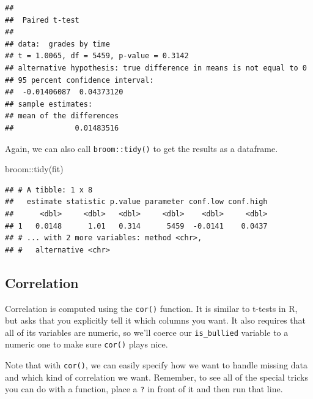 \documentclass[
]{book}
\newenvironment{Shaded}{\begin{snugshade}}{\end{snugshade}}
\newcommand{\AttributeTok}[1]{\textcolor[rgb]{0.77,0.63,0.00}{#1}}
\newcommand{\FunctionTok}[1]{\textcolor[rgb]{0.00,0.00,0.00}{#1}}
\newcommand{\NormalTok}[1]{#1}
\newcommand{\OtherTok}[1]{\textcolor[rgb]{0.56,0.35,0.01}{#1}}
\newcommand{\SpecialCharTok}[1]{\textcolor[rgb]{0.00,0.00,0.00}{#1}}
\newcommand{\StringTok}[1]{\textcolor[rgb]{0.31,0.60,0.02}{#1}}
\begin{document}
\begin{verbatim}
## 
##  Paired t-test
## 
## data:  grades by time
## t = 1.0065, df = 5459, p-value = 0.3142
## alternative hypothesis: true difference in means is not equal to 0
## 95 percent confidence interval:
##  -0.01406087  0.04373120
## sample estimates:
## mean of the differences 
##              0.01483516
\end{verbatim}

Again, we can also call \texttt{broom::tidy()} to get the results as a dataframe.

\begin{Shaded}
\begin{Highlighting}[]
\NormalTok{broom}\SpecialCharTok{::}\FunctionTok{tidy}\NormalTok{(fit)}
\end{Highlighting}
\end{Shaded}

\begin{verbatim}
## # A tibble: 1 x 8
##   estimate statistic p.value parameter conf.low conf.high
##      <dbl>     <dbl>   <dbl>     <dbl>    <dbl>     <dbl>
## 1   0.0148      1.01   0.314      5459  -0.0141    0.0437
## # ... with 2 more variables: method <chr>,
## #   alternative <chr>
\end{verbatim}

\hypertarget{correlation}{%
\subsection{Correlation}\label{correlation}}

Correlation is computed using the \texttt{cor()} function. It is similar to t-tests in R, but asks that you explicitly tell it which columns you want. It also requires that all of its variables are numeric, so we'll coerce our \texttt{is\_bullied} variable to a numeric one to make sure \texttt{cor()} plays nice.

Note that with \texttt{cor()}, we can easily specify how we want to handle missing data and which kind of correlation we want. Remember, to see all of the special tricks you can do with a function, place a \texttt{?} in front of it and then run that line.

\begin{Shaded}
\end{Shaded}
\end{document}

